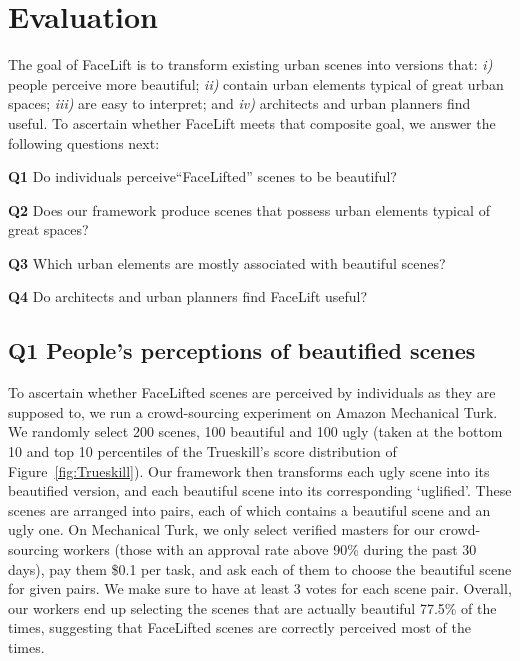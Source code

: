 \section{Evaluation}
\label{sec:evaluation}

The goal of FaceLift is to transform existing urban scenes into versions that: \emph{i)} people perceive more beautiful; \emph{ii)} contain urban elements typical of great urban spaces; \emph{iii)} are easy to interpret; and \emph{iv)} architects and urban planners find useful. To ascertain whether FaceLift meets that composite goal, we answer the following questions next: 

\begin{description}
\item{\textbf{Q1}} Do individuals perceive``FaceLifted'' scenes to be beautiful?

\item{\textbf{Q2}}  Does our framework produce scenes that possess urban elements typical of great spaces?

\item{\textbf{Q3}}  Which urban elements are mostly associated with beautiful scenes?

\item{\textbf{Q4}}  Do architects and urban planners find FaceLift useful?

\end{description}


\subsection*{Q1 People's perceptions of beautified scenes}
To ascertain whether FaceLifted scenes are perceived by individuals as they are supposed to, we run a crowd-sourcing experiment on Amazon Mechanical Turk.  We randomly select 200 scenes, 100 beautiful and 100 ugly  (taken at the bottom 10 and top 10 percentiles of the Trueskill's score distribution of Figure~\ref{fig:Trueskill}). Our framework then transforms each ugly scene into its beautified version, and each beautiful scene into its corresponding `uglified'. These scenes are arranged into pairs, each of which contains a beautiful scene and an ugly one. On  Mechanical Turk, we only select verified masters for our crowd-sourcing workers (those with an approval rate above 90\% during the past 30 days), pay them \$0.1 per  task,  and ask each of them to choose the beautiful scene for given pairs.  We make sure to have at least 3 votes for each scene pair. Overall, our workers end up selecting the scenes that are actually beautiful 77.5\% of the times, suggesting that FaceLifted scenes are correctly perceived most of the times.


